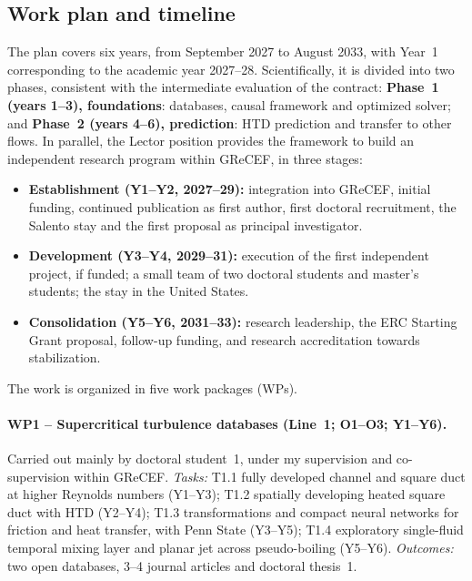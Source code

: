\documentclass[11pt]{article}
\begin{document}
\subsection{Work plan and timeline}\label{sec:workplan}
The plan covers six years, from September 2027 to August 2033, with Year~1 corresponding to
the academic year 2027--28. Scientifically, it is divided into two phases, consistent with the
intermediate evaluation of the contract: \textbf{Phase~1 (years 1--3), foundations}:
databases, causal framework and optimized solver; and \textbf{Phase~2 (years 4--6),
prediction}: HTD prediction and transfer to other flows. In parallel, the Lector position
provides the framework to build an independent research program within GReCEF, in three
stages:
\begin{itemize}
  \item \textbf{Establishment (Y1--Y2, 2027--29):} integration into GReCEF, initial funding,
  continued publication as first author, first doctoral recruitment, the Salento stay and the first proposal as principal
  investigator.
  \item \textbf{Development (Y3--Y4, 2029--31):} execution of the first independent project,
  if funded; a small team of two doctoral students and master's students; the stay in the
  United States.
  \item \textbf{Consolidation (Y5--Y6, 2031--33):} research leadership, the ERC Starting Grant
  proposal, follow-up funding, and research accreditation towards stabilization.
\end{itemize}
The work is organized in five work packages (WPs).

\paragraph{WP1 -- Supercritical turbulence databases (Line~1; O1--O3; Y1--Y6).} Carried out
mainly by doctoral student~1, under my supervision and co-supervision within GReCEF.
\emph{Tasks:} T1.1 fully developed channel and square duct at higher Reynolds numbers
(Y1--Y3); T1.2 spatially developing heated square duct with HTD (Y2--Y4); T1.3 transformations
and compact neural networks for friction and heat transfer, with Penn State (Y3--Y5); T1.4
exploratory single-fluid temporal mixing layer and planar jet across pseudo-boiling (Y5--Y6).
\emph{Outcomes:} two open databases, 3--4 journal articles and doctoral thesis~1.
\end{document}
